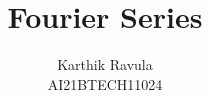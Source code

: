 \documentclass[journal,12pt,twocolumn]{IEEEtran}
\begin{document}
\let\StandardTheFigure\thefigure
\renewcommand{\thefigure}{\theproblem}



\def\putbox#1#2#3{\makebox[0in][l]{\makebox[#1][l]{}\raisebox{\baselineskip}[0in][0in]{\raisebox{#2}[0in][0in]{#3}}}}
     \def\rightbox#1{\makebox[0in][r]{#1}}
     \def\centbox#1{\makebox[0in]{#1}}
     \def\topbox#1{\raisebox{-\baselineskip}[0in][0in]{#1}}
     \def\midbox#1{\raisebox{-0.5\baselineskip}[0in][0in]{#1}}

\vspace{3cm}

\title{ 
Fourier Series
}


%
%
%

\author{ Karthik Ravula\\
AI21BTECH11024%
}
% 
%
\end{document}
